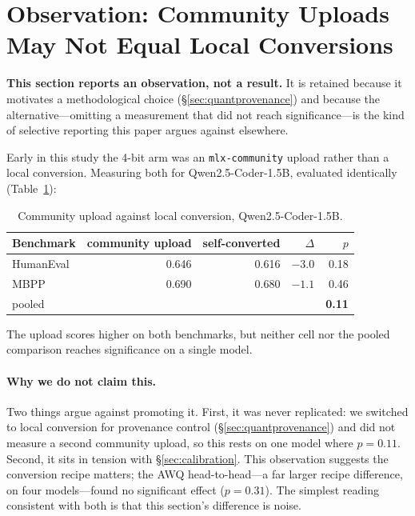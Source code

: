 \documentclass[11pt]{article}
\begin{document}
\section{Observation: Community Uploads May Not Equal Local Conversions}
\label{sec:uploads}

\textbf{This section reports an observation, not a result.} It is retained because it
motivates a methodological choice (\S\ref{sec:quantprovenance}) and because the
alternative---omitting a measurement that did not reach significance---is the kind of
selective reporting this paper argues against elsewhere.

Early in this study the 4-bit arm was an \texttt{mlx-community} upload rather than a local
conversion. Measuring both for Qwen2.5-Coder-1.5B, evaluated identically
(Table~\ref{tab:uploads}):

\begin{table}[h]
  \centering
  \caption{Community upload against local conversion, Qwen2.5-Coder-1.5B.}
  \label{tab:uploads}
  \smallskip
  \begin{tabular}{lrrrr}
    \toprule
    Benchmark & community upload & self-converted & $\Delta$ & $p$ \\
    \midrule
    HumanEval & 0.646 & 0.616 & $-3.0$ & 0.18 \\
    MBPP      & 0.690 & 0.680 & $-1.1$ & 0.46 \\
    pooled    &       &       &        & \textbf{0.11} \\
    \bottomrule
  \end{tabular}
\end{table}

The upload scores higher on both benchmarks, but neither cell nor the pooled comparison
reaches significance on a single model.

\paragraph{Why we do not claim this.} Two things argue against promoting it. First, it
was never replicated: we switched to local conversion for provenance control
(\S\ref{sec:quantprovenance}) and did not measure a second community upload, so this
rests on one model where $p = 0.11$. Second, it sits in tension with
\S\ref{sec:calibration}. This observation suggests the conversion recipe matters; the AWQ
head-to-head---a far larger recipe difference, on four models---found no significant
effect ($p = 0.31$). The simplest reading consistent with both is that this section's
difference is noise.
\end{document}
